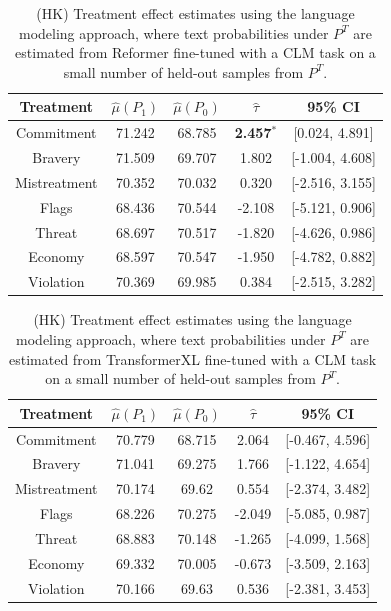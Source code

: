 \documentclass{article}
\begin{document}
\begin{table}[!ht]
    \centering
    \begin{tabular}{c|cccc}
        \toprule
        Treatment & $\hat{\mu}(P_1)$ & $\hat{\mu}(P_0)$ & $\hat{\tau}$ & 95\% CI \\
        \midrule
        Commitment & 71.242 & 68.785 & \textbf{\textcolor{green!50!black}{2.457$^*$}} & [0.024, 4.891] \\
        Bravery & 71.509 & 69.707 & \textcolor{green!50!black}{1.802} & [-1.004, 4.608] \\
        Mistreatment & 70.352 & 70.032 & \textcolor{green!50!black}{0.320} & [-2.516, 3.155] \\
        Flags & 68.436 & 70.544 & \textcolor{red!80!black}{-2.108} & [-5.121, 0.906] \\
        Threat & 68.697 & 70.517 & \textcolor{red!80!black}{-1.820} & [-4.626, 0.986]  \\
        Economy & 68.597 & 70.547 & \textcolor{red!80!black}{-1.950} & [-4.782, 0.882] \\
        Violation & 70.369 & 69.985 & \textcolor{green!50!black}{0.384} & [-2.515, 3.282] \\
        \bottomrule
    \end{tabular}
    \caption{(HK) Treatment effect estimates using the language modeling approach, where text probabilities under $P^T$ are estimated from Reformer fine-tuned with a CLM task on a small number of held-out samples from $P^T$.}
    \label{tab:results_clm_reformer}
\end{table}

\begin{table}[!ht]
    \centering
    \begin{tabular}{c|cccc}
        \toprule
        Treatment & $\hat{\mu}(P_1)$ & $\hat{\mu}(P_0)$ & $\hat{\tau}$ & 95\% CI \\
        \midrule
        Commitment & 70.779 & 68.715 & \textcolor{green!50!black}{2.064} & [-0.467, 4.596] \\
        Bravery & 71.041 & 69.275 & \textcolor{green!50!black}{1.766} & [-1.122, 4.654] \\
        Mistreatment & 70.174 & 69.62 & \textcolor{green!50!black}{0.554} & [-2.374, 3.482] \\
        Flags & 68.226 & 70.275 & \textcolor{red!80!black}{-2.049} & [-5.085, 0.987] \\
        Threat & 68.883 & 70.148 & \textcolor{red!80!black}{-1.265} & [-4.099, 1.568]  \\
        Economy & 69.332 & 70.005 & \textcolor{red!80!black}{-0.673} & [-3.509, 2.163] \\
        Violation & 70.166 & 69.63 & \textcolor{green!50!black}{0.536} & [-2.381, 3.453] \\
        \bottomrule
    \end{tabular}
    \caption{(HK) Treatment effect estimates using the language modeling approach, where text probabilities under $P^T$ are estimated from TransformerXL fine-tuned with a CLM task on a small number of held-out samples from $P^T$.}
    \label{tab:results_clm_transformerxl}
\end{table}
\end{document}
